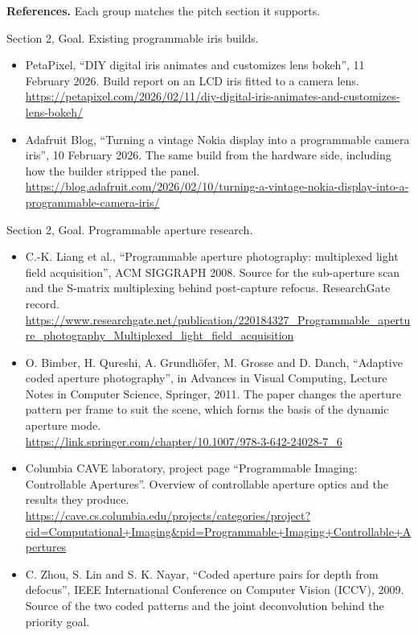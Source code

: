 \vspace{0.5em}
\noindent\textbf{References.} Each group matches the pitch section it supports.
\begingroup\sloppy

\vspace{0.3em}
\noindent Section 2, Goal. Existing programmable iris builds.
\begin{itemize}
    \item[{[G1]}]\label{ref:G1} PetaPixel, ``DIY digital iris animates and customizes lens bokeh'', 11 February 2026. Build report on an LCD iris fitted to a camera lens. \\
    \url{https://petapixel.com/2026/02/11/diy-digital-iris-animates-and-customizes-lens-bokeh/}
    \item[{[G2]}]\label{ref:G2} Adafruit Blog, ``Turning a vintage Nokia display into a programmable camera iris'', 10 February 2026. The same build from the hardware side, including how the builder stripped the panel. \\
    \url{https://blog.adafruit.com/2026/02/10/turning-a-vintage-nokia-display-into-a-programmable-camera-iris/}
\end{itemize}

\noindent Section 2, Goal. Programmable aperture research.
\begin{itemize}
    \item[{[G3]}]\label{ref:G3} C.-K. Liang et al., ``Programmable aperture photography: multiplexed light field acquisition'', ACM SIGGRAPH 2008. Source for the sub-aperture scan and the S-matrix multiplexing behind post-capture refocus. ResearchGate record. \\
    \url{https://www.researchgate.net/publication/220184327_Programmable_aperture_photography_Multiplexed_light_field_acquisition}
    \item[{[G4]}]\label{ref:G4} O. Bimber, H. Qureshi, A. Grundh\"ofer, M. Grosse and D. Danch, ``Adaptive coded aperture photography'', in Advances in Visual Computing, Lecture Notes in Computer Science, Springer, 2011. The paper changes the aperture pattern per frame to suit the scene, which forms the basis of the dynamic aperture mode. \\
    \url{https://link.springer.com/chapter/10.1007/978-3-642-24028-7_6}
    \item[{[G5]}]\label{ref:G5} Columbia CAVE laboratory, project page ``Programmable Imaging: Controllable Apertures''. Overview of controllable aperture optics and the results they produce. \\
    \url{https://cave.cs.columbia.edu/projects/categories/project?cid=Computational+Imaging&pid=Programmable+Imaging+Controllable+Apertures}
    \item[{[G6]}]\label{ref:G6} C. Zhou, S. Lin and S. K. Nayar, ``Coded aperture pairs for depth from defocus'', IEEE International Conference on Computer Vision (ICCV), 2009. Source of the two coded patterns and the joint deconvolution behind the priority goal.
\end{itemize}

\endgroup
